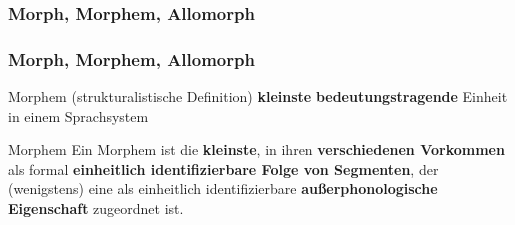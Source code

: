 \subsubsection{Morph, Morphem, Allomorph}


\begin{frame}
\frametitle{Morph, Morphem, Allomorph}

\begin{block}{Morphem (strukturalistische Definition)}
	\textbf{kleinste} \textbf{bedeutungstragende} Einheit in einem Sprachsystem
\end{block}

\pause

\begin{block}{Morphem}
	Ein Morphem ist die \textbf{kleinste}, in ihren \textbf{verschiedenen Vorkommen} als formal \textbf{einheitlich identifizierbare Folge von Segmenten}, der (wenigstens) eine als einheitlich identifizierbare \textbf{außerphonologische Eigenschaft} zugeordnet ist.
	
	\hfill \citep[38]{Wurzel84x}
\end{block}

\end{frame}


